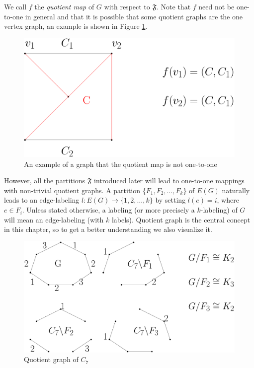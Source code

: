 \documentclass[12pt,a4paper,titlepage,openany]{report}
\begin{document}
We call $f$ the \textit{quotient map} of $G$ with respect to $\mathfrak{F}$. Note that $f$ need not be one-to-one in general and that it is possible that some quotient graphs are the one vertex graph, an example is shown in Figure \ref{fnotonetoone}.
\begin{figure}[h]\label{fnotonetoone}
\begin{center}
\includegraphics[width=1\linewidth]{figures/fnotonetoone.png}
\end{center}
\caption{An example of a graph that the quotient map is not one-to-one}
\end{figure}
 However, all the partitions $\mathfrak{F}$ introduced later will lead to one-to-one mappings with non-trivial quotient graphs.\newline
A partition $\{F_1,F_2,\ldots ,F_k\}$ of $E(G)$ naturally leads to an edge-labeling $l:E(G)\to \{1,2,\ldots,k\}$ by setting $l(e)=i$, where $e\in F_i$. Unless stated
otherwise, a labeling (or more precisely a $k$-labeling) of $G$ will mean an edge-labeling (with $k$ labels).
\newline 
Quotient graph is the central concept in this chapter, so to get a better understanding we also visualize it.
\begin{figure}[h!]
\begin{center}
\includegraphics[width=1\linewidth]{figures/quotientgraph.png}
\end{center}
\caption{Quotient graph of $C_7$}
\end{figure}
\end{document}
